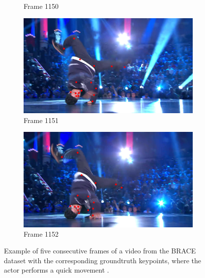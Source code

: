 \documentclass[./main.tex]{subfiles}
\begin{document}
\begin{figure}[htbp]
\begin{subfigure}{0.45\textwidth}
        \caption{Frame 1150}
    \end{subfigure}
    \begin{subfigure}{0.45\textwidth}
        \centering
        \includegraphics[width=\textwidth]{entities/BRACE_1151.png}
        \caption{Frame 1151}
    \end{subfigure}
    \begin{subfigure}{0.45\textwidth}
        \centering
        \includegraphics[width=\textwidth]{entities/BRACE_1152.png}
        \caption{Frame 1152}
    \end{subfigure}
    \caption{Example of five consecutive frames of a video from the BRACE dataset with the corresponding groundtruth keypoints, where the actor performs a quick movement \cite{BRACE}.}
    \label{fig:BRACE_dataset_quick}
\end{figure}
\end{document}
